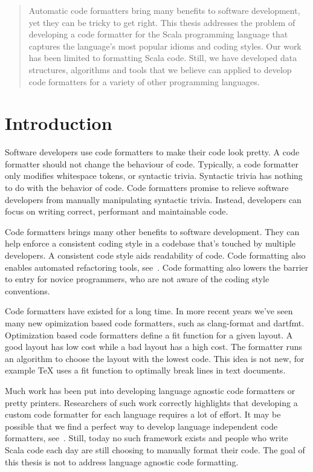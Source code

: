 \documentclass[11pt,a4paper]{article}
\begin{document}



\begin{abstract}
  Automatic code formatters bring many benefits to software development, yet they can be tricky to get right.
  This thesis addresses the problem of developing a code formatter for the
  Scala programming language that captures the language's most popular idioms
  and coding styles.
  Our work has been limited to formatting Scala code.
  Still, we have developed data structures, algorithms and tools that we
  believe can applied to develop code formatters for a variety of other
  programming languages.
\end{abstract}
\tableofcontents
% 
\section{Introduction} %
\label{sec:Introduction}
Software developers use code formatters to make their code look pretty.
A code formatter should not change the behaviour of code.
Typically, a code formatter only modifies whitespace tokens, or syntactic trivia.
Syntactic trivia has nothing to do with the behavior of code.
Code formatters promise to relieve software developers from manually manipulating
syntactic trivia.
Instead, developers can focus on writing correct, performant and maintainable code.

Code formatters brings many other benefits to software development.
They can help enforce a consistent coding style in a codebase that's touched by multiple developers.
A consistent code style aids readability of code.
Code formatting also enables automated refactoring tools, see~\autocite{wright_large-scale_2013}.
Code formatting also lowers the barrier to entry for novice programmers, who are not aware of the coding style conventions.

Code formatters have existed for a long time.
In more recent years we've seen many new opimization based code formatters, such as clang-format and dartfmt.
Optimization based code formatters define a fit function for a given layout.
A good layout has low cost while a bad layout has a high cost.
The formatter runs an algorithm to choose the layout with the lowest code.
This idea is not new, for example TeX uses a fit function to optimally break lines
in text documents.

Much work has been put into developing language agnostic code formatters or pretty printers.
Researchers of such work correctly highlights that developing a custom code formatter for each language requires a lot of effort.
It may be possible that we find a perfect way to develop language independent code formatters, see~\autocite{mps_article}.
Still, today no such framework exists and people who write Scala code each day are still choosing to manually format their code.
The goal of this thesis is not to address language agnostic code formatting.
\end{document}
